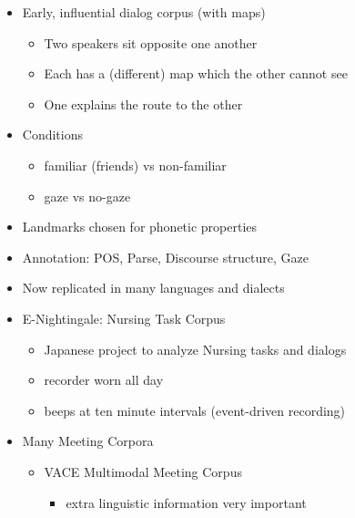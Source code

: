 \documentclass[a4paper,landscape,headrule,footrule,xetex]{foils}
\begin{document}
\begin{itemize}
\item Early, influential dialog corpus (with maps)
  \begin{itemize}
  \item Two speakers sit opposite one another
  \item Each has a (different) map which the other cannot see
  \item One explains the route to the other
  \end{itemize}
\item Conditions
  \begin{itemize}
  \item familiar (friends) vs non-familiar
  \item gaze vs no-gaze
  \end{itemize}
\item Landmarks chosen for phonetic properties
\item Annotation: POS, Parse, Discourse structure, Gaze
\item Now replicated in many languages and dialects
\end{itemize}

\MyLogo{}
\begin{itemize}
\item E-Nightingale: Nursing Task Corpus
\begin{itemize}
\item Japanese project to analyze Nursing tasks and dialogs
\item recorder worn all day
\item beeps at ten minute intervals  (event-driven recording)
\end{itemize}
\item Many Meeting Corpora
  \begin{itemize}
  \item VACE Multimodal Meeting Corpus
    \begin{itemize}
    \item extra linguistic information very important
    \end{itemize}
  \end{itemize}
\end{itemize}  
\end{document}
